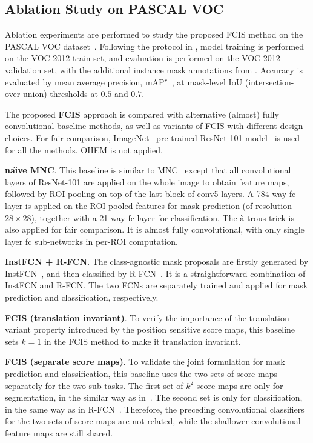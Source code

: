 \documentclass[10pt,twocolumn,letterpaper]{article}
\begin{document}
\subsection{Ablation Study on PASCAL VOC}
\label{sec.exp}

Ablation experiments are performed to study the proposed FCIS method on the PASCAL VOC dataset~\cite{everingham2010pascal}. Following the protocol in \cite{hariharan2014simultaneous,dai2015convolutional,hariharan2015hyper,dai2016mnc}, model training is performed on the VOC 2012 train set, and evaluation is performed on the VOC 2012 validation set, with the additional instance mask annotations from \cite{hariharan2011semantic}. Accuracy is evaluated by mean average precision, mAP$^r$~\cite{hariharan2014simultaneous}, at mask-level IoU (intersection-over-union) thresholds at $0.5$ and $0.7$.

The proposed \textbf{FCIS} approach is compared with alternative (almost) fully convolutional baseline methods, as well as variants of FCIS with different design choices. For fair comparison, ImageNet~\cite{deng2009imagenet} pre-trained ResNet-101 model~\cite{he2016deep} is used for all the methods. OHEM is not applied.

\textbf{na\"{\i}ve MNC}. This baseline is similar to MNC~\cite{dai2016mnc} except that all convolutional layers of ResNet-101 are applied on the whole image to obtain feature maps, followed by ROI pooling on top of the last block of conv5 layers. A 784-way fc layer is applied on the ROI pooled features for mask prediction (of resolution $28 \times 28$), together with a 21-way fc layer for classification. The \`{a} trous trick is also applied for fair comparison. It is almost fully convolutional, with only single layer fc sub-networks in per-ROI computation.

\textbf{InstFCN + R-FCN}. The class-agnostic mask proposals are firstly generated by InstFCN~\cite{dai2016instance}, and then classified by R-FCN~\cite{dai2016rfcn}. It is a straightforward combination of InstFCN and R-FCN. The two FCNs are separately trained and applied for mask prediction and classification, respectively.

\textbf{FCIS (translation invariant)}. To verify the importance of the translation-variant property introduced by the position sensitive score maps, this baseline sets $k=1$ in the FCIS method to make it translation invariant.

\textbf{FCIS (separate score maps)}. To validate the joint formulation for mask prediction and classification, this baseline uses the two sets of score maps separately for the two sub-tasks. The first set of $k^2$ score maps are only for segmentation, in the similar way as in~\cite{dai2016instance}. The second set is only for classification, in the same way as in R-FCN~\cite{dai2016rfcn}. Therefore, the preceding convolutional classifiers for the two sets of score maps are not related, while the shallower convolutional feature maps are still shared.
\end{document}
